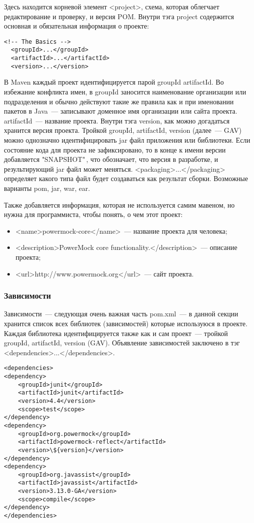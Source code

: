 Здесь находится корневой элемент <project>, схема, которая облегчает редактирование и проверку, и версия POM. Внутри тэга project содержится основная и обязательная информация о проекте:

\begin{lstlisting}
<!-- The Basics -->
  <groupId>...</groupId>
  <artifactId>...</artifactId>
  <version>...</version>
\end{lstlisting}

В Maven каждый проект идентифицируется парой groupId artifactId. Во избежание конфликта имен, в groupId заносится наименование организации или подразделения и обычно действуют такие же правила как и при именовании пакетов в Java~--- записывают доменное имя организации или сайта проекта. artifactId~--- название проекта. Внутри тэга version, как можно догадаться хранится версия проекта. Тройкой groupId, artifactId, version (далее~--- GAV) можно однозначно идентифицировать jar файл приложения или библиотеки. Если состояние кода для проекта не зафиксировано, то в конце к имени версии добавляется "\-SNAPSHOT"\,, что обозначает, что версия в разработке, и результирующий jar файл может меняться. <packaging>...</packaging> определяет какого типа файл будет создаваться как результат сборки. Возможные варианты pom, jar, war, ear.

Также добавляется информация, которая не используется самим мавеном, но нужна для программиста, чтобы понять, о чем этот проект:
\begin{itemize}
\item<name>powermock-core</name>~--- название проекта для человека;
\item<description>PowerMock core functionality.</description>~--- описание проекта;
\item<url>http://www.powermock.org</url>~--- сайт проекта.
\end{itemize}

\subsubsection{Зависимости}
Зависимости~--- следующая очень важная часть pom.xml~--- в данной секции хранится список всех библиотек (зависимостей) которые используюся в проекте. Каждая библиотека идентифицируется также как и сам проект~--- тройкой groupId, artifactId, version (GAV). Объявление зависимостей заключено в тэг <dependencies>...</dependencies>.

\begin{lstlisting}
<dependencies>
<dependency>
    <groupId>junit</groupId>
    <artifactId>junit</artifactId>
    <version>4.4</version>
    <scope>test</scope>
</dependency>
<dependency>
    <groupId>org.powermock</groupId>
    <artifactId>powermock-reflect</artifactId>
    <version>\${version}</version>
</dependency>
<dependency>
    <groupId>org.javassist</groupId>
    <artifactId>javassist</artifactId>
    <version>3.13.0-GA</version>
    <scope>compile</scope>
</dependency>
</dependencies>
\end{lstlisting}

